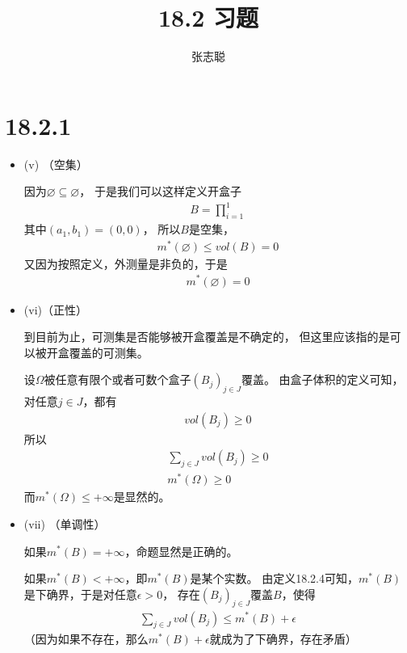 \documentclass{article}
\begin{document}
\title{18.2 习题}
\author{张志聪}
\maketitle

\section*{18.2.1}

\begin{itemize}
  \item (v) （空集）

        因为$\varnothing \subseteq \varnothing$，
        于是我们可以这样定义开盒子
        \begin{align*}
          B = \prod\limits_{i=1}^{1}
        \end{align*}
        其中$(a_1, b_1) = (0, 0)$，
        所以$B$是空集，
        \begin{align*}
          m^{\ast}(\varnothing) \leq vol(B) = 0
        \end{align*}
        又因为按照定义，外测量是非负的，于是
        \begin{align*}
          m^{\ast}(\varnothing) = 0
        \end{align*}

  \item (vi)（正性）

        到目前为止，可测集是否能够被开盒覆盖是不确定的，
        但这里应该指的是可以被开盒覆盖的可测集。

        设$\Omega$被任意有限个或者可数个盒子$(B_j)_{j \in J}$覆盖。
        由盒子体积的定义可知，对任意$j \in J$，都有
        \begin{align*}
          vol(B_j) \geq 0
        \end{align*}
        所以
        \begin{align*}
          \sum\limits_{j \in J} vol(B_j) \geq 0 \\
          m^{\ast}(\Omega) \geq 0
        \end{align*}
        而$m^{\ast}(\Omega) \leq +\infty$是显然的。

  \item (vii) （单调性）

        如果$m^{\ast}(B) = +\infty$，命题显然是正确的。

        如果$m^{\ast}(B) < +\infty$，即$m^{\ast}(B)$是某个实数。
        由定义18.2.4可知，$m^{\ast}(B)$是下确界，于是对任意$\epsilon > 0$，
        存在$(B_j)_{j \in J}$覆盖$B$，使得
        \begin{align*}
          \sum\limits_{j \in J} vol(B_j) \leq m^{\ast}(B) + \epsilon
        \end{align*}
        （因为如果不存在，那么$m^{\ast}(B) + \epsilon$就成为了下确界，存在矛盾）


\end{itemize}
\end{document}
